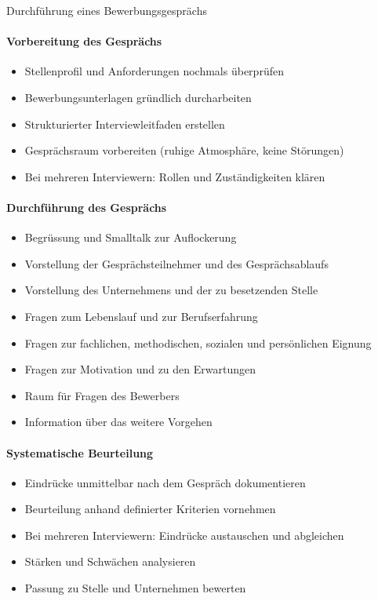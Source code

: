 \begin{KR}{Durchführung eines Bewerbungsgesprächs}\\
\paragraph{Vorbereitung des Gesprächs}
\begin{itemize}
    \item Stellenprofil und Anforderungen nochmals überprüfen
    \item Bewerbungsunterlagen gründlich durcharbeiten
    \item Strukturierter Interviewleitfaden erstellen
    \item Gesprächsraum vorbereiten (ruhige Atmosphäre, keine Störungen)
    \item Bei mehreren Interviewern: Rollen und Zuständigkeiten klären
\end{itemize}

\paragraph{Durchführung des Gesprächs}
\begin{itemize}
    \item Begrüssung und Smalltalk zur Auflockerung
    \item Vorstellung der Gesprächsteilnehmer und des Gesprächsablaufs
    \item Vorstellung des Unternehmens und der zu besetzenden Stelle
    \item Fragen zum Lebenslauf und zur Berufserfahrung
    \item Fragen zur fachlichen, methodischen, sozialen und persönlichen Eignung
    \item Fragen zur Motivation und zu den Erwartungen
    \item Raum für Fragen des Bewerbers
    \item Information über das weitere Vorgehen
\end{itemize}

\paragraph{Systematische Beurteilung}
\begin{itemize}
    \item Eindrücke unmittelbar nach dem Gespräch dokumentieren
    \item Beurteilung anhand definierter Kriterien vornehmen
    \item Bei mehreren Interviewern: Eindrücke austauschen und abgleichen
    \item Stärken und Schwächen analysieren
    \item Passung zu Stelle und Unternehmen bewerten
\end{itemize}


\end{KR}
